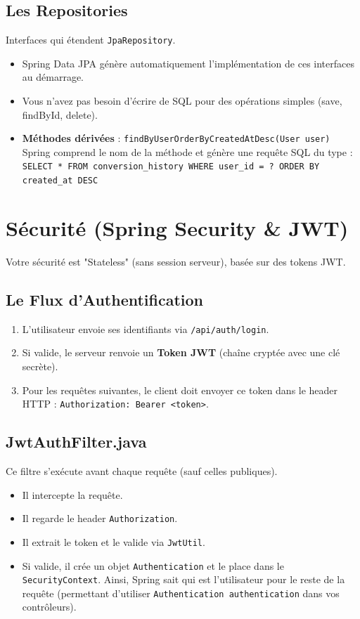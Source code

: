 \documentclass{article}
\begin{document}
\subsection{Les Repositories}
Interfaces qui étendent \texttt{JpaRepository}.
\begin{itemize}
    \item Spring Data JPA génère automatiquement l'implémentation de ces interfaces au démarrage.
    \item Vous n'avez pas besoin d'écrire de SQL pour des opérations simples (save, findById, delete).
    \item \textbf{Méthodes dérivées} : \texttt{findByUserOrderByCreatedAtDesc(User user)}
    \\ Spring comprend le nom de la méthode et génère une requête SQL du type :
    \\ \texttt{SELECT * FROM conversion\_history WHERE user\_id = ? ORDER BY created\_at DESC}
\end{itemize}

\section{Sécurité (Spring Security & JWT)}

Votre sécurité est "Stateless" (sans session serveur), basée sur des tokens JWT.

\subsection{Le Flux d'Authentification}
\begin{enumerate}
    \item L'utilisateur envoie ses identifiants via \texttt{/api/auth/login}.
    \item Si valide, le serveur renvoie un \textbf{Token JWT} (chaîne cryptée avec une clé secrète).
    \item Pour les requêtes suivantes, le client doit envoyer ce token dans le header HTTP : \texttt{Authorization: Bearer <token>}.
\end{enumerate}

\subsection{JwtAuthFilter.java}
Ce filtre s'exécute avant chaque requête (sauf celles publiques).
\begin{itemize}
    \item Il intercepte la requête.
    \item Il regarde le header \texttt{Authorization}.
    \item Il extrait le token et le valide via \texttt{JwtUtil}.
    \item Si valide, il crée un objet \texttt{Authentication} et le place dans le \texttt{SecurityContext}. Ainsi, Spring sait qui est l'utilisateur pour le reste de la requête (permettant d'utiliser \texttt{Authentication authentication} dans vos contrôleurs).
\end{itemize}
\end{document}
